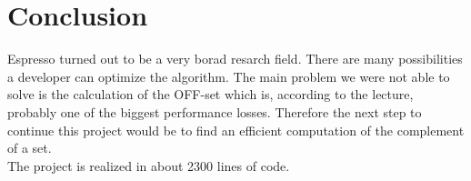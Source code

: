 \documentclass[colorback,accentcolor=tud1c,11pt]{tudreport}
\begin{document}
 \chapter{Conclusion}
 Espresso turned out to be a very borad resarch field. There are many possibilities a developer can optimize the algorithm. The main problem we were not able to solve is the calculation of the OFF-set which is, according to the lecture, probably one of the biggest performance losses. Therefore the next step to continue this project would be to find an efficient computation of the complement of a set.
 \\
  The project is realized in about 2300 lines of code.

  
  
\end{document}
